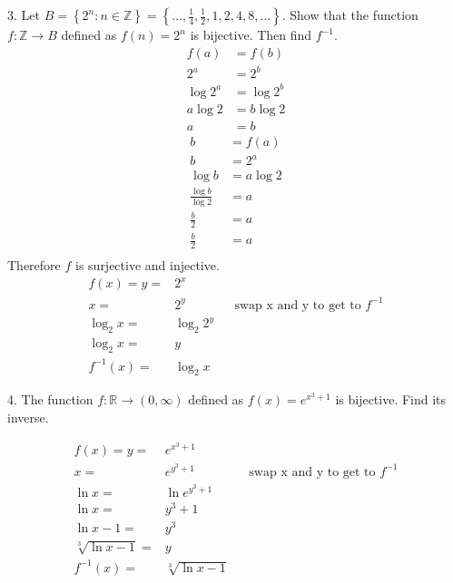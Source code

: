 \documentclass{hippoidC}
\begin{document}
\begin{prooflist}{3. Let $B=\left\{2^n: n \in \mathbb{Z}\right\}=\left\{\ldots,
			\frac{1}{4}, \frac{1}{2}, 1,2,4,8, \ldots\right\}$. Show that the function
		$f: \mathbb{Z} \rightarrow B$ defined as $f(n)=2^n$ is bijective. Then find
		$f^{-1}$.}
	\inj{}
	\begin{align*}
		f(a)     & =f(b)     \\
		2^a      & =2^b      \\
		\log 2^a & =\log 2^b \\
		a \log 2 & =b \log 2 \\
		a        & =b
	\end{align*}
	\surj{}
	\begin{align*}
		b                     & =f(a)     \\
		b                     & =2^a      \\
		\log b                & =a \log 2 \\
		\frac{\log b}{\log 2} & = a       \\
		\frac{b}{2}           & = a       \\
		\frac{b}{2}           & = a       \\
	\end{align*}
	Therefore $f$ is surjective and injective.
	\begin{align*}
		f(x)=y=     & 2^x                                                  \\
		x=          & 2^y        &  & \text{swap x and y to get to }f^{-1} \\
		\log_2 x=   & \log_2 2^y                                           \\
		\log_2 x=   & y                                                    \\
		f^{-1}(x) = & \log_2 x
	\end{align*}
\end{prooflist}

\begin{prooflist}{4. The function $f: \mathbb{R} \rightarrow(0, \infty)$ defined
		as $f(x)=e^{x^3+1}$ is bijective. Find its inverse.}
	\item
	\begin{align*}
		f(x)=y=            & e^{x^3+1}                                                   \\
		x=                 & e^{y^3+1}         &  & \text{swap x and y to get to }f^{-1} \\
		\ln x=             & \ln e^{y^3+1}                                               \\
		\ln x=             & y^3+1                                                       \\
		\ln x-1=           & y^3                                                         \\
		\sqrt[3]{\ln x-1}= & y                                                           \\
		f^{-1}(x) =        & \sqrt[3]{\ln x-1}
	\end{align*}
\end{prooflist}
\end{document}

